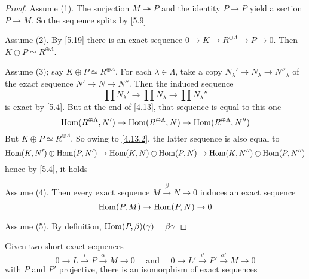\documentclass[11pt]{article}
\begin{document}
\begin{proof}
Assume (1). The surjection \(M\twoheadrightarrow P\) and the identity \(P\to
   P\) yield a section \(P\to M\). So the sequence splits by \ref{5.9}

Assume (2). By \ref{5.19} there is an exact sequence \(0\to K\to
   R^{\oplus\Lambda}\to P\to0\). Then \(K\oplus P\simeq R^{\oplus\Lambda}\).

Assume (3); say \(K\oplus P\simeq R^{\oplus\Lambda}\). For each
\(\lambda\in\Lambda\), take a copy \(N_\lambda'\to N_\lambda\to N''_\lambda\)
of the exact sequence \(N'\to N\to N''\). Then the induced sequence
\begin{equation*}
\prod N_\lambda'\to\prod N_\lambda\to \prod N_\lambda''
\end{equation*}
is exact by \ref{5.4}. But at the end of \ref{4.13}, that sequence is equal to
this one
\begin{equation*}
\operatorname{Hom}(R^{\oplus\Lambda},N')\to\operatorname{Hom}(R^{\oplus\Lambda},N)\to\operatorname{Hom}(R^{\oplus\Lambda},N'')
\end{equation*}
But \(K\oplus P\simeq R^{\oplus\Lambda}\). So owing to \eqref{4.13.2}, the
latter sequence is also equal to
\begin{equation*}
\operatorname{Hom}(K,N')\oplus\operatorname{Hom}(P,N')\to\operatorname{Hom}(K,N)\oplus\operatorname{Hom}(P,N)\to\operatorname{Hom}(K,N'')\oplus\operatorname{Hom}(P,N'')
\end{equation*}
hence by \ref{5.4}, it holds

Assume (4). Then every exact sequence \(M\xrightarrow{\beta}N\to0\) induces an
exact sequence
\begin{equation*}
\operatorname{Hom}(P,M)\to\operatorname{Hom}(P,N)\to0
\end{equation*}

Assume (5). By definition, \(\operatorname{Hom}(P,\beta)(\gamma)=\beta\gamma\)
\end{proof}

\begin{lemma}[Schanuel]
Given two short exact sequences
\begin{equation*}
0\to L\xrightarrow{i}P\xrightarrow{\alpha}M\to0 \quad\text{ and }\quad
0\to L'\xrightarrow{i'}P'\xrightarrow{\alpha'}M\to0
\end{equation*}
with \(P\) and \(P'\) projective, there is an isomorphism of exact sequences
\begin{center}
\end{center}
\end{lemma}
\end{document}
